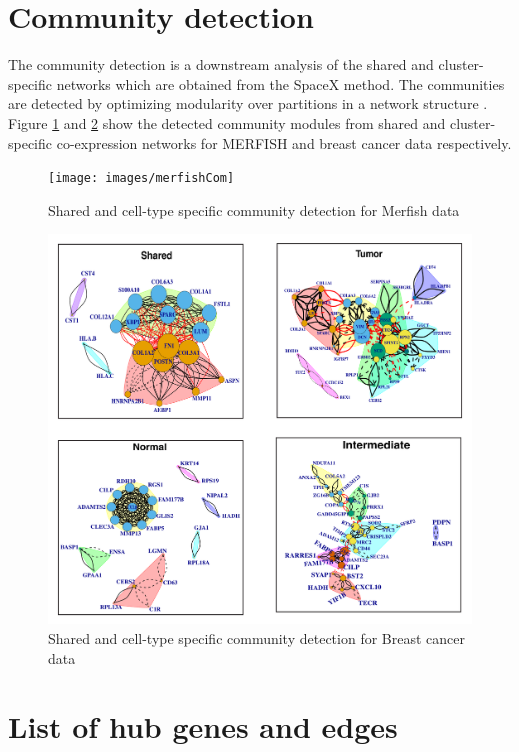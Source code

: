 \documentclass[
]{book}
\begin{document}
\hypertarget{communitydetection}{%
\section{Community detection}\label{communitydetection}}

The community detection is a downstream analysis of the shared and cluster-specific networks which are obtained from the SpaceX method. The communities are detected by optimizing modularity over partitions in a network structure \citep{brandes2007modularity}. Figure \ref{fig:comMERFISH} and \ref{fig:comBC} show the detected community modules from shared and cluster-specific co-expression networks for MERFISH and breast cancer data respectively.

\begin{figure}

{\centering \texttt{[image: images/merfishCom]} 

}

\caption{Shared and cell-type specific community detection for Merfish data}\label{fig:comMERFISH}
\end{figure}

\begin{figure}

{\centering \includegraphics[width=0.8\linewidth]{images/BC_Com} 

}

\caption{Shared and cell-type specific community detection for Breast cancer data}\label{fig:comBC}
\end{figure}

\hypertarget{list-of-hub-genes-and-edges}{%
\section{List of hub genes and edges}\label{list-of-hub-genes-and-edges}}
\end{document}
